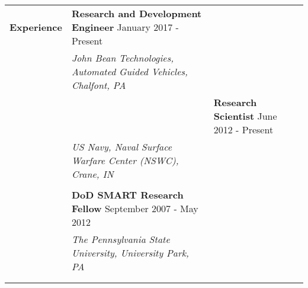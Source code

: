 \begin{tabular}{L{\hlcolw}  L{\rcolw}}
\textbf{\Large Experience} & \textbf{\large Research and Development Engineer} \hfill {\large January 2017 - Present}  \\
& \textit{\large John Bean Technologies, Automated Guided Vehicles, Chalfont, PA} \\ 
&
\vspace{-0.2in} 


& \textbf{\large Research Scientist} \hfill {\large June 2012 - Present}  \\
& \textit{\large US Navy, Naval Surface Warfare Center (NSWC), Crane, IN} \\ 
&
\vspace{-0.2in} 

\\

& \textbf{\large DoD SMART Research Fellow} \hfill {\large September 2007 - May 2012}  \\
& \textit{\large The Pennsylvania State University, University Park, PA} \\ 
& 
\vspace{-0.2in} 


\\
	\hline \\ 
\end{tabular}